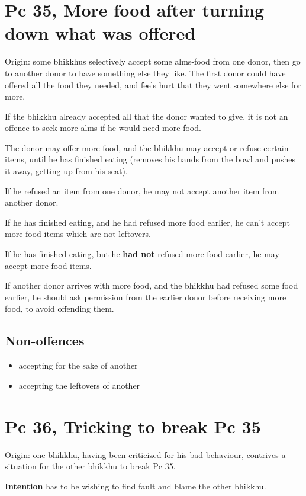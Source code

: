 \section{Pc 35, More food after turning down what was offered}

Origin: some bhikkhus selectively accept some alms-food from one donor,
then go to another donor to have something else they like. The first
donor could have offered all the food they needed, and feels hurt that
they went somewhere else for more.

If the bhikkhu already accepted all that the donor wanted to give, it is
not an offence to seek more alms if he would need more food.

The donor may offer more food, and the bhikkhu may accept or refuse
certain items, until he has finished eating (removes his hands from the
bowl and pushes it away, getting up from his seat).

If he refused an item from one donor, he may not accept another item
from another donor.

If he has finished eating, and he had refused more food earlier, he
can't accept more food items which are not leftovers.

If he has finished eating, but he \textbf{had not} refused more food
earlier, he may accept more food items.

If another donor arrives with more food, and the bhikkhu had refused
some food earlier, he should ask permission from the earlier donor
before receiving more food, to avoid offending them.

\subsection{Non-offences}

\begin{itemize}
\tightlist
\item
  accepting for the sake of another
\item
  accepting the leftovers of another
\end{itemize}

\section{Pc 36, Tricking to break Pc 35}

Origin: one bhikkhu, having been criticized for his bad behaviour,
contrives a situation for the other bhikkhu to break Pc 35.

\textbf{Intention} has to be wishing to find fault and blame the other
bhikkhu.

